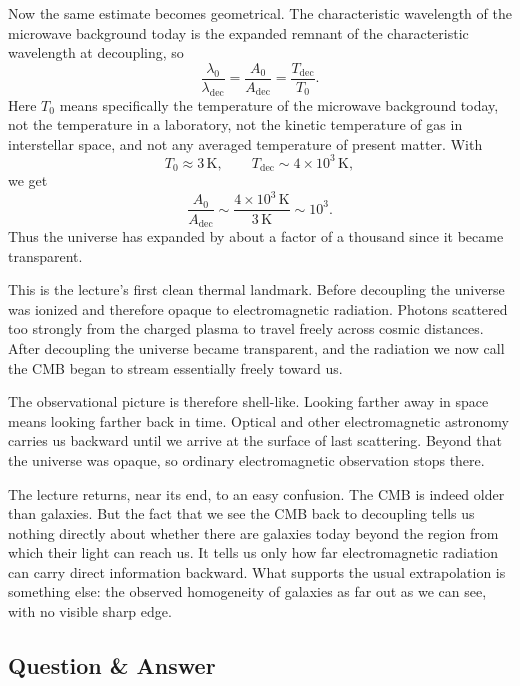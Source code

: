 Now the same estimate becomes geometrical. The characteristic wavelength of the microwave background today is the expanded remnant of the characteristic wavelength at decoupling, so
\begin{equation}
\frac{\lambda_0}{\lambda_{\mathrm{dec}}}
=
\frac{A_0}{A_{\mathrm{dec}}}
=
\frac{T_{\mathrm{dec}}}{T_0}.
\end{equation}
Here \(T_0\) means specifically the temperature of the microwave background today, not the temperature in a laboratory, not the kinetic temperature of gas in interstellar space, and not any averaged temperature of present matter. With
\[
T_0 \approx 3\,\mathrm{K},
\qquad
T_{\mathrm{dec}} \sim 4\times 10^3\,\mathrm{K},
\]
we get
\begin{equation}
\frac{A_0}{A_{\mathrm{dec}}}
\sim
\frac{4\times 10^3\,\mathrm{K}}{3\,\mathrm{K}}
\sim 10^3.
\end{equation}
Thus the universe has expanded by about a factor of a thousand since it became transparent.

This is the lecture's first clean thermal landmark. Before decoupling the universe was ionized and therefore opaque to electromagnetic radiation. Photons scattered too strongly from the charged plasma to travel freely across cosmic distances. After decoupling the universe became transparent, and the radiation we now call the CMB began to stream essentially freely toward us.

The observational picture is therefore shell-like. Looking farther away in space means looking farther back in time. Optical and other electromagnetic astronomy carries us backward until we arrive at the surface of last scattering. Beyond that the universe was opaque, so ordinary electromagnetic observation stops there.

The lecture returns, near its end, to an easy confusion. The CMB is indeed older than galaxies. But the fact that we see the CMB back to decoupling tells us nothing directly about whether there are galaxies today beyond the region from which their light can reach us. It tells us only how far electromagnetic radiation can carry direct information backward. What supports the usual extrapolation is something else: the observed homogeneity of galaxies as far out as we can see, with no visible sharp edge.

\subsection{Question \& Answer}

